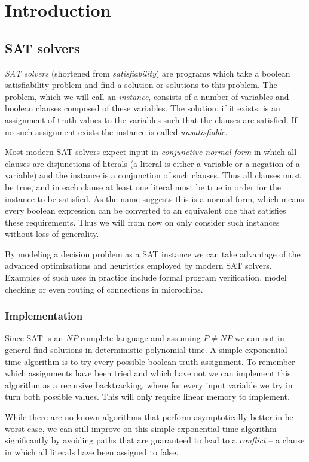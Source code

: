 \chapter{Introduction}
\section{SAT solvers}
\emph{SAT solvers} (shortened from \emph{satisfiability}) are programs which take a boolean satisfiability problem and find a solution or solutions to this problem.
The problem, which we will call an \emph{instance}, consists of a number of variables and boolean clauses composed of these variables.
The solution, if it exists, is an assignment of truth values to the variables such that the clauses are satisfied.
If no such assignment exists the instance is called \emph{unsatisfiable}.

Most modern SAT solvers expect input in \emph{conjunctive normal form} in which all clauses are disjunctions of literals (a literal is either a variable or a negation of a variable) and the instance is a conjunction of such clauses.
Thus all clauses must be true, and in each clause at least one literal must be true in order for the instance to be satisfied.
As the name suggests this is a normal form, which means every boolean expression can be converted to an equivalent one that satisfies these requirements.
Thus we will from now on only consider such instances without loss of generality.

By modeling a decision problem as a SAT instance we can take advantage of the advanced optimizations and heuristics employed by modern SAT solvers.
Examples of such uses in practice include formal program verification, model checking or even routing of connections in microchips.

\subsection{Implementation}
Since SAT is an $NP$-complete language and assuming $P \neq NP$ we can not in general find solutions in deterministic polynomial time.
A simple exponential time algorithm is to try every possible boolean truth assignment.
To remember which assignments have been tried and which have not we can implement this algorithm as a recursive backtracking, where for every input variable we try in turn both possible values.
This will only require linear memory to implement.

While there are no known algorithms that perform asymptotically better in he worst case, we can still improve on this simple exponential time algorithm significantly by avoiding paths that are guaranteed to lead to a \emph{conflict} -- a clause in which all literals have been assigned to false.

